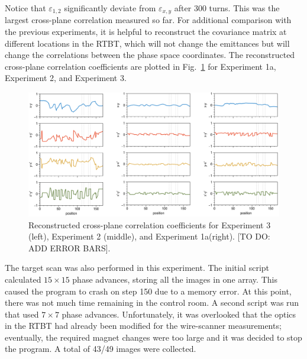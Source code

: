 Notice that $\varepsilon_{1,2}$ significantly deviate from $\varepsilon_{x,y}$ after 300 turns. This was the largest cross-plane correlation measured so far. For additional comparison with the previous experiments, it is helpful to reconstruct the covariance matrix at different locations in the RTBT, which will not change the emittances but will change the correlations between the phase space coordinates. The reconstructed cross-plane correlation coefficients are plotted in Fig.~\ref{fig:exp3_compare_corr} for Experiment 1a, Experiment 2, and Experiment 3. 
%
\begin{figure}[!p]
    \centering
    \vspace*{3.0cm}
    \includegraphics[width=\textwidth]{Images/chapter5/exp3/compare_corr.png}
    \caption{Reconstructed cross-plane correlation coefficients for Experiment 3 (left), Experiment 2 (middle), and Experiment 1a(right). [TO DO: ADD ERROR BARS].}
    \label{fig:exp3_compare_corr}
    \vspace*{3.0cm}
\end{figure}
%

The target scan was also performed in this experiment. The initial script calculated $15 \times 15$ phase advances, storing all the images in one array. This caused the program to crash on step 150 due to a memory error. At this point, there was not much time remaining in the control room. A second script was run that used $7 \times 7$ phase advances. Unfortunately, it was overlooked that the optics in the RTBT had already been modified for the wire-scanner measurements; eventually, the required magnet changes were too large and it was decided to stop the program. A total of 43/49 images were collected.

